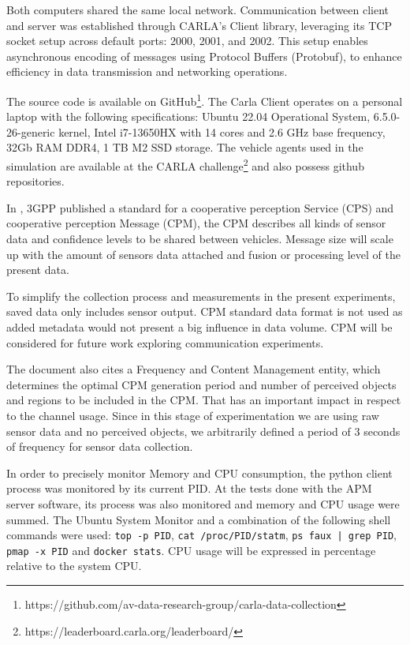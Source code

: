Both computers shared the same local network. Communication between client and server was established through CARLA's Client library, leveraging its TCP socket setup across default ports: 2000, 2001, and 2002. This setup enables asynchronous encoding of messages using Protocol Buffers (Protobuf), to enhance efficiency in data transmission and networking operations. 

The source code is available on GitHub\footnote[7]{https://github.com/av-data-research-group/carla-data-collection}. The Carla Client operates on a personal laptop with the following specifications: Ubuntu 22.04 Operational System, 6.5.0-26-generic kernel, Intel i7-13650HX with 14 cores and 2.6 GHz base frequency, 32Gb RAM DDR4, 1 TB M2 SSD storage. The vehicle agents used in the simulation are available at the CARLA challenge\footnote[8]{https://leaderboard.carla.org/leaderboard/} and also possess github repositories.

In \cite{etsi2019intelligent}, 3GPP published a standard for a cooperative perception Service (CPS) and cooperative perception Message (CPM), the CPM describes all kinds of sensor data and confidence levels to be shared between vehicles.  Message size will scale up with the amount of sensors data attached and fusion or processing level of the present data.
 
To simplify the collection process and measurements in the present experiments, saved data only includes sensor output. CPM standard data format is not used as added metadata would not present a big influence in data volume. CPM will be considered for future work exploring communication experiments.

The document also cites a Frequency and Content Management entity, which determines the optimal CPM generation period and number of perceived objects and regions to be included in the CPM. That has an important impact in respect to the channel usage. Since in this stage of experimentation we are using raw sensor data and no perceived objects, we arbitrarily defined a period of 3 seconds of frequency for sensor data collection.

In order to precisely monitor Memory and CPU consumption, the python client process was monitored by its current PID. At the tests done with the APM server software, its process was also monitored and memory and CPU usage were summed. The Ubuntu System Monitor and a combination of the following shell commands were used: \texttt{top -p PID}, \texttt{cat /proc/PID/statm}, \texttt{ps faux | grep PID}, \texttt{pmap -x PID} and \texttt{docker stats}. CPU usage will be expressed in percentage relative to the system CPU.

